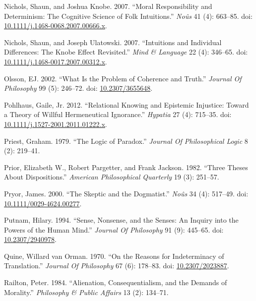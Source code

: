 \documentclass[
  10pt,
  letterpaper,
  DIV=11,
  numbers=noendperiod,
  twoside]{scrartcl}
\newlength{\cslhangindent}
\newenvironment{CSLReferences}[2] %
 {\begin{list}{}{%
  \setlength{\itemindent}{0pt}
  \setlength{\leftmargin}{0pt}
  \setlength{\parsep}{0pt}
  \ifodd #1
   \setlength{\leftmargin}{\cslhangindent}
   \setlength{\itemindent}{-1\cslhangindent}
  \fi
  \setlength{\itemsep}{#2\baselineskip}}}
 {\end{list}}
\begin{document}
\begin{CSLReferences}{1}{0}
Nichols, Shaun, and Joshua Knobe. 2007. {``Moral Responsibility and
Determinism: The Cognitive Science of Folk Intuitions.''} \emph{Noûs} 41
(4): 663--85. doi:
\href{https://doi.org/10.1111/j.1468-0068.2007.00666.x}{10.1111/j.1468-0068.2007.00666.x}.

Nichols, Shaun, and Joseph Ulatowski. 2007. {``Intuitions and Individual
Differences: The Knobe Effect Revisited.''} \emph{Mind \& Language} 22
(4): 346--65. doi:
\href{https://doi.org/10.1111/j.1468-0017.2007.00312.x}{10.1111/j.1468-0017.2007.00312.x}.

Olsson, EJ. 2002. {``What Is the Problem of Coherence and Truth.''}
\emph{Journal Of Philosophy} 99 (5): 246--72. doi:
\href{https://doi.org/10.2307/3655648}{10.2307/3655648}.

Pohlhaus, Gaile, Jr. 2012. {``Relational Knowing and Epistemic
Injustice: Toward a Theory of Willful Hermeneutical Ignorance.''}
\emph{Hypatia} 27 (4): 715--35. doi:
\href{https://doi.org/10.1111/j.1527-2001.2011.01222.x}{10.1111/j.1527-2001.2011.01222.x}.

Priest, Graham. 1979. {``The Logic of Paradox.''} \emph{Journal Of
Philosophical Logic} 8 (2): 219--41.

Prior, Elizabeth W., Robert Pargetter, and Frank Jackson. 1982. {``Three
Theses About Dispositions.''} \emph{American Philosophical Quarterly} 19
(3): 251--57.

Pryor, James. 2000. {``The Skeptic and the Dogmatist.''} \emph{Noûs} 34
(4): 517--49. doi:
\href{https://doi.org/10.1111/0029-4624.00277}{10.1111/0029-4624.00277}.

Putnam, Hilary. 1994. {``Sense, Nonsense, and the Senses: An Inquiry
into the Powers of the Human Mind.''} \emph{Journal Of Philosophy} 91
(9): 445--65. doi:
\href{https://doi.org/10.2307/2940978}{10.2307/2940978}.

Quine, Willard van Orman. 1970. {``On the Reasons for Indeterminacy of
Translation.''} \emph{Journal Of Philosophy} 67 (6): 178--83. doi:
\href{https://doi.org/10.2307/2023887}{10.2307/2023887}.

Railton, Peter. 1984. {``Alienation, Consequentialism, and the Demands
of Morality.''} \emph{Philosophy \& Public Affairs} 13 (2): 134--71.


\end{CSLReferences}
\end{document}
